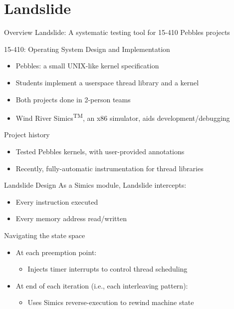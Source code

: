 \documentclass[xcolor=dvipsnames]{beamer}
\begin{document}

\section{Landslide}


\begin{frame}{Overview}
	Landslide: A systematic testing tool for 15-410 Pebbles projects
	\linegap

	15-410: Operating System Design and Implementation
	\begin{itemize}
		\item Pebbles: a small UNIX-like kernel specification
		\item Students implement a userspace thread library and a kernel
		\item Both projects done in 2-person teams
		\item Wind River Simics\textsuperscript{TM}, an x86 simulator, aids development/debugging
	\end{itemize}
	\pause
	\linegap

	Project history
	\begin{itemize}
		\item Tested Pebbles kernels, with user-provided annotations
		\item Recently, fully-automatic instrumentation for thread libraries
	\end{itemize}
\end{frame}

\begin{frame}{Landslide Design}
	As a Simics module, Landslide intercepts:
	\begin{itemize}
		\item Every instruction executed
		\item Every memory address read/written
	\end{itemize}
	\pause
	\linegap

	Navigating the state space
	\begin{itemize}
		\item At each preemption point:
		\begin{itemize}
			\item Injects timer interrupts to control thread scheduling
		\end{itemize}
		\item At end of each iteration (i.e., each interleaving pattern):
		\begin{itemize}
			\item Uses Simics reverse-execution to rewind machine state
		\end{itemize}
	\end{itemize}
\end{frame}
\end{document}
